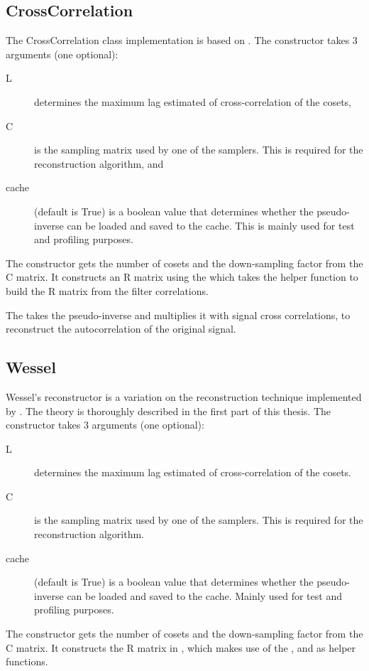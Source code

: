 \documentclass[a4paper, openany, oneside]{memoir}
\begin{document}
\subsection{CrossCorrelation}
\label{sub:crosscorrelation}
The CrossCorrelation class implementation is based on \cite{ariananda2012compressive}. The constructor takes 3 arguments (one optional):
\begin{description}
    \item[L] determines the maximum lag estimated of cross-correlation of the cosets,
    \item[C] is the sampling matrix used by one of the samplers. This is required for the reconstruction algorithm, and
    \item[cache] (default is True) is a boolean value that determines whether the pseudo-inverse can be loaded and saved to the cache. This is mainly used for test and profiling purposes.
\end{description}
The constructor gets the number of cosets and the down-sampling factor from the C matrix. It constructs an R matrix using the  which takes the  helper function to build the R matrix from the filter correlations.

The  takes the pseudo-inverse and multiplies it with signal cross correlations, to reconstruct the autocorrelation of the original signal.

\subsection{Wessel}
\label{sub:wessel}
Wessel's reconstructor is a variation on the reconstruction technique implemented by . The theory is thoroughly described in the first part of this thesis. The constructor takes 3 arguments (one optional):
\begin{description}
    \item[L] determines the maximum lag estimated of cross-correlation of the cosets.
    \item[C] is the sampling matrix used by one of the samplers. This is required for the reconstruction algorithm.
    \item[cache] (default is True) is a boolean value that determines whether the pseudo-inverse can be loaded and saved to the cache. Mainly used for test and profiling purposes.
\end{description}
The constructor gets the number of cosets and the down-sampling factor from the C matrix. It constructs the R matrix in , which makes use of the ,  and  as helper functions.
\end{document}
